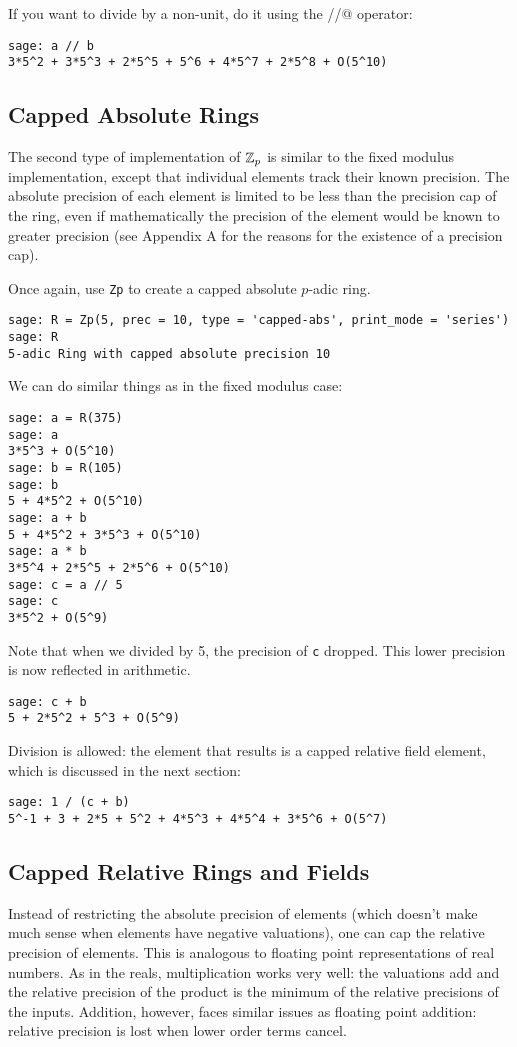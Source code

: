 \documentclass[12pt]{article}
\begin{document}
If you want to divide by a non-unit, do it using the \verb@//@ operator:
\begin{verbatim}
sage: a // b
3*5^2 + 3*5^3 + 2*5^5 + 5^6 + 4*5^7 + 2*5^8 + O(5^10)
\end{verbatim}

\subsection{Capped Absolute Rings}
The second type of implementation of $\mathbb{Z}_p$ is similar to the fixed modulus implementation,
except that individual elements track their known precision.
The absolute precision of each element is limited to be less than the precision cap of the ring,
even if mathematically the precision of the element would be known to greater precision
(see Appendix A for the reasons for the existence of a precision cap).

Once again, use \verb/Zp/ to create a capped absolute $p$-adic ring.
\begin{verbatim}
sage: R = Zp(5, prec = 10, type = 'capped-abs', print_mode = 'series')
sage: R
5-adic Ring with capped absolute precision 10
\end{verbatim}

We can do similar things as in the fixed modulus case:
\begin{verbatim}
sage: a = R(375)
sage: a
3*5^3 + O(5^10)
sage: b = R(105)
sage: b
5 + 4*5^2 + O(5^10)
sage: a + b
5 + 4*5^2 + 3*5^3 + O(5^10)
sage: a * b
3*5^4 + 2*5^5 + 2*5^6 + O(5^10)
sage: c = a // 5
sage: c
3*5^2 + O(5^9)
\end{verbatim}

Note that when we divided by 5, the precision of \verb/c/ dropped.  This lower precision is now reflected in arithmetic.
\begin{verbatim}
sage: c + b
5 + 2*5^2 + 5^3 + O(5^9)
\end{verbatim}

Division is allowed: the element that results is a capped relative field element, which is discussed in the next section:
\begin{verbatim}
sage: 1 / (c + b)
5^-1 + 3 + 2*5 + 5^2 + 4*5^3 + 4*5^4 + 3*5^6 + O(5^7)
\end{verbatim}

\subsection{Capped Relative Rings and Fields}
Instead of restricting the absolute precision of elements (which doesn't make much sense when elements have negative
valuations), one can cap the relative precision of elements.  This is analogous to floating point representations
of real numbers.  As in the reals, multiplication works very well: the valuations add and the relative precision of
the product is the minimum of the relative precisions of the inputs.   Addition, however, faces similar issues as
floating point addition: relative precision is lost when lower order terms cancel.
\end{document}
